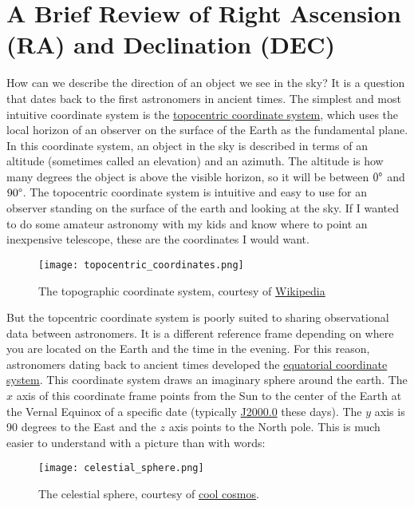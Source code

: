 \section{A Brief Review of Right Ascension (RA) and Declination (DEC)}
\label{section_ra_dec}
How can we describe the direction of an object we see in the sky?
It is a question that dates back to the first astronomers in ancient times.
The simplest and most intuitive coordinate system is the \href{https://en.wikipedia.org/wiki/Horizontal_coordinate_system}{topocentric coordinate system},
which uses the local horizon of an observer on the surface of the Earth as the fundamental plane.
In this coordinate system, an object in the sky is described in terms of an altitude (sometimes called an elevation) and an azimuth.
The altitude is how many degrees the object is above the visible horizon, so it will be between $0 \degree$ and $90 \degree$.
The topocentric coordinate system is intuitive and easy to use for an observer standing on the surface of the earth and looking at the sky.
If I wanted to do some amateur astronomy with my kids and know where to point an inexpensive telescope, these are the coordinates I would want.
\begin{figure}[hbt!]
\begin{center}
\texttt{[image: topocentric\_coordinates.png]}
\caption{The topographic coordinate system, courtesy of \href{https://en.wikipedia.org/wiki/Horizontal_coordinate_system}{Wikipedia}}
\end{center}
\end{figure}

But the topcentric coordinate system is poorly suited to sharing observational data between astronomers.
It is a different reference frame depending on where you are located on the Earth and the time in the evening.
For this reason, astronomers dating back to ancient times developed the \href{https://en.wikipedia.org/wiki/Equatorial_coordinate_system}{equatorial coordinate system}.
This coordinate system draws an imaginary sphere around the earth.
The $x$ axis of this coordinate frame points from the Sun to the center of the Earth at the Vernal Equinox of a specific date 
(typically \href{https://en.wikipedia.org/wiki/Epoch_(astronomy)}{J2000.0} these days).
The $y$ axis is 90 degrees to the East and the $z$ axis points to the North pole.
This is much easier to understand with a picture than with words:
\begin{figure}[hbt!]
\begin{center}
\texttt{[image: celestial\_sphere.png]}
\caption{The celestial sphere, courtesy of \href{http://coolcosmos.ipac.caltech.edu/cosmic_classroom/cosmic_reference/coordsys.html}{cool cosmos}.}
\end{center}
\end{figure}

